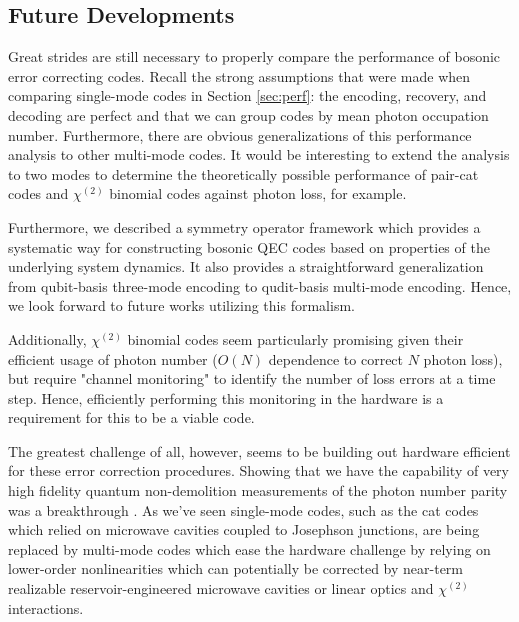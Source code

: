 \documentclass[12]{amsart}
\newcommand\0{\mathbf{0}}
\newcommand\<{\langle}
\renewcommand\>{\rangle}
\begin{document}
\subsection{Future Developments}

Great strides are still necessary to properly compare the performance of bosonic error correcting codes. Recall the strong assumptions that were made when comparing single-mode codes in Section \ref{sec:perf}: the encoding, recovery, and decoding are perfect and that we can group codes by mean photon occupation number. Furthermore, there are obvious generalizations of this performance analysis to other multi-mode codes. It would be interesting to extend the analysis to two modes to determine the theoretically possible performance of pair-cat codes and $\chi^{(2)}$ binomial codes against photon loss, for example.

Furthermore, we described a symmetry operator framework which provides a systematic way for constructing bosonic QEC codes based on properties of the underlying system dynamics. It also provides a straightforward generalization from qubit-basis three-mode encoding to qudit-basis multi-mode encoding. Hence, we look forward to future works utilizing this formalism.

Additionally, $\chi^{(2)}$ binomial codes seem particularly promising given their efficient usage of photon number ($O(N)$ dependence to correct $N$ photon loss), but require "channel monitoring" to identify the number of loss errors at a time step. Hence, efficiently performing this monitoring in the hardware is a requirement for this to be a viable code.

The greatest challenge of all, however, seems to be building out hardware efficient for these error correction procedures. Showing that we have the capability of very high fidelity quantum non-demolition measurements of the photon number parity was a breakthrough \cite{sun2014tracking}. As we've seen single-mode codes, such as the cat codes which relied on microwave cavities coupled to Josephson junctions, are being replaced by multi-mode codes which ease the hardware challenge by relying on lower-order nonlinearities which can potentially be corrected by near-term realizable reservoir-engineered microwave cavities \cite{albert2018multimode} or linear optics and $\chi^{(2)}$ interactions.

\nocite{*}


\end{document}
